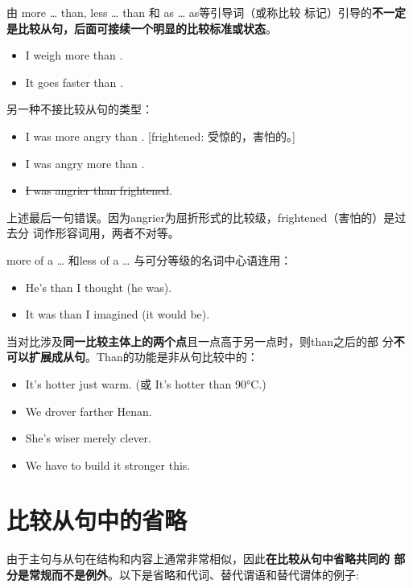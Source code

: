 由 more \ldots{} than, less \ldots{} than 和 as \ldots{} as等引导词（或称比较
标记）引导的\textbf{不一定是比较从句，后面可接续一个明显的比较标准或状态}。
\begin{itemize}
\item I weigh more than .

\item It goes faster than .

\end{itemize}

另一种不接比较从句的类型：
\begin{itemize}
\item I was more angry than . [frightened:
   受惊的，害怕的。]
\item I was angry more than .

\item \sout{I was angrier than frightened}.
\end{itemize}
上述最后一句错误。因为angrier为屈折形式的比较级，frightened（害怕的）是过去分
词作形容词用，两者不对等。

more of a \ldots{} 和less of a \ldots{} 与可分等级的名词中心语连用：
\begin{itemize}
\item He's  than I thought (he was).

\item It was  than I imagined (it would be).
\end{itemize}

当对比涉及\textbf{同一比较主体上的两个点}且一点高于另一点时，则than之后的部
分\textbf{不可以扩展成从句}。Than的功能是非从句比较中的：
\begin{itemize}
\item It's hotter  just warm. (或 It's hotter than 90°C.)
\item We drover farther  Henan.
\item She's wiser  merely clever.
\item We have to build it stronger  this.
\end{itemize}

\section{比较从句中的省略}

由于主句与从句在结构和内容上通常非常相似，因此\textbf{在比较从句中省略共同的
  部分是常规而不是例外}。以下是省略和代词、替代谓语和替代谓体的例子:

